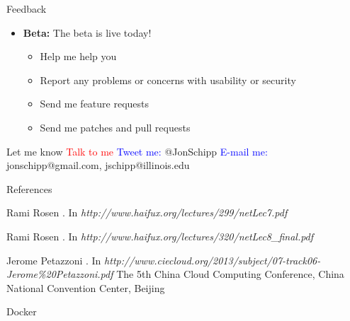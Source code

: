 \documentclass[xcolor=svgnames,handout]{beamer}
\begin{document}
\begin{frame}{Feedback}
  \begin{itemize}
    \item \textbf{Beta:} The beta is live today!
    	\begin{itemize}
		\item Help me help you
 	\item Report any problems or concerns with usability or security
    	\item Send me feature requests
	        \item Send me patches and pull requests
  	\end{itemize}
  \end{itemize}
  \begin{exampleblock}{Let me know}
  \textcolor{red}{Talk to me} \newline
  \textcolor{blue}{Tweet  me:} @JonSchipp \newline
  \textcolor{blue}{E-mail me:} jonschipp@gmail.com, jschipp@illinois.edu \newline
  \end{exampleblock}
\end{frame}

\begin{frame}[allowframebreaks]{References}
\begin{thebibliography}{1}
Rami Rosen
.
\newblock In {\em http://www.haifux.org/lectures/299/netLec7.pdf}

Rami Rosen
.
\newblock In {\em http://www.haifux.org/lectures/320/netLec8\_final.pdf}

Jerome Petazzoni
.
\newblock In {\em http://www.ciecloud.org/2013/subject/07-track06-Jerome\%20Petazzoni.pdf} The 5th China Cloud Computing Conference, China National Convention Center, Beijing

Docker

\end{thebibliography}
\end{frame}
\end{document}
